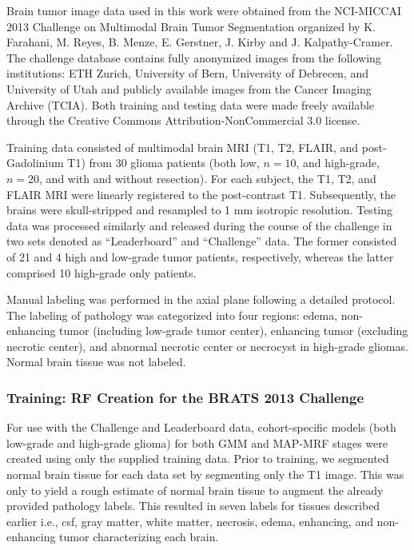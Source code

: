 \documentclass[preprint,authoryear,review,12pt]{elsarticle}
\begin{document}
Brain tumor image data used in this work were obtained from the NCI-MICCAI 2013 
Challenge on Multimodal Brain Tumor Segmentation
organized by K. Farahani, M. Reyes, B. Menze, E. Gerstner, J. Kirby and J. Kalpathy-Cramer. 
The challenge database contains fully anonymized images from the following institutions: 
ETH Zurich, University of Bern, University of Debrecen, and University of Utah and 
publicly available images from the Cancer Imaging Archive (TCIA).  Both training 
and testing data were made freely available through the Creative Commons Attribution-NonCommercial 3.0 license.

Training data consisted of multimodal brain MRI (T1, T2, FLAIR, and 
post-Gadolinium T1) from 30 glioma patients (both low, $n=10$, and high-grade, $n=20$,
and with and without resection).  For each subject, the T1, T2, and 
FLAIR MRI were linearly registered to the post-contrast T1.  Subsequently,
the brains were skull-stripped and resampled to 1 mm isotropic resolution.
Testing data was processed similarly and released during the course of the
challenge in two sets denoted as ``Leaderboard'' and ``Challenge'' data.  
The former consisted of 21 and 4 high and low-grade tumor patients, respectively,
whereas the latter comprised 10 high-grade only patients.

Manual labeling was performed in the axial plane following a detailed
protocol.
The labeling of pathology was categorized into four regions:
edema, non-enhancing tumor (including low-grade tumor center), 
enhancing tumor (excluding necrotic center), and abnormal
necrotic center or necrocyst in high-grade gliomas.
Normal brain tissue was not labeled. 

\subsubsection{Training: RF Creation for the BRATS 2013 Challenge}

For use with the Challenge and Leaderboard data, cohort-specific models (both 
low-grade and 
high-grade glioma) for both GMM and MAP-MRF stages were created using only the 
supplied training data.  Prior to training, we segmented normal brain tissue \citep{avants2011}
for each data set by segmenting only the T1 image.  This was only to yield
a rough estimate of normal brain tissue to augment the already provided 
pathology labels.  This resulted in seven labels for tissues described
earlier i.e., csf, gray matter, white matter,
necrosis, edema, enhancing, and non-enhancing tumor characterizing each brain.
\end{document}
